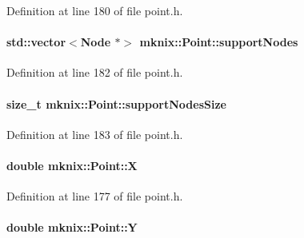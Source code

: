 Definition at line 180 of file point.\+h.

\hypertarget{classmknix_1_1_point_a3e608826c9042a2ddad6053f5b233211}{}
\paragraph[{support\+Nodes}]{\setlength{\rightskip}{0pt plus 5cm}std\+::vector$<${\bf Node} $\ast$$>$ mknix\+::\+Point\+::support\+Nodes\hspace{0.3cm}{\ttfamily [protected]}}\label{classmknix_1_1_point_a3e608826c9042a2ddad6053f5b233211}


Definition at line 182 of file point.\+h.

\hypertarget{classmknix_1_1_point_a141fd098ad72a85cb4d11362b80ca0d8}{}
\paragraph[{support\+Nodes\+Size}]{\setlength{\rightskip}{0pt plus 5cm}size\+\_\+t mknix\+::\+Point\+::support\+Nodes\+Size\hspace{0.3cm}{\ttfamily [protected]}}\label{classmknix_1_1_point_a141fd098ad72a85cb4d11362b80ca0d8}


Definition at line 183 of file point.\+h.

\hypertarget{classmknix_1_1_point_a1ab5edb86e6de2df07c3d11ed7c2ca99}{}
\paragraph[{X}]{\setlength{\rightskip}{0pt plus 5cm}double mknix\+::\+Point\+::\+X\hspace{0.3cm}{\ttfamily [protected]}}\label{classmknix_1_1_point_a1ab5edb86e6de2df07c3d11ed7c2ca99}


Definition at line 177 of file point.\+h.

\hypertarget{classmknix_1_1_point_aeb9947adb5c6a4cd01ca81f4c4934ed5}{}
\paragraph[{Y}]{\setlength{\rightskip}{0pt plus 5cm}double mknix\+::\+Point\+::\+Y\hspace{0.3cm}{\ttfamily [protected]}}\label{classmknix_1_1_point_aeb9947adb5c6a4cd01ca81f4c4934ed5}


